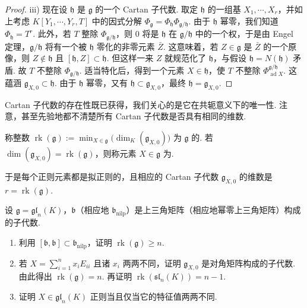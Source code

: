 \begin{proof}
iii) 现在设 $\mathfrak h$ 是 $\mathfrak g$ 的一个 Cartan 子代数. 取定 $\mathfrak h$ 的一组基 $X_1,\cdots,X_r$，并如上考虑 $K[Y_1,\cdots,Y_r,T]$ 中的因式分解 $\Phi_{\mathfrak g}=\Phi_{\mathfrak h}\Phi_{\mathfrak g/\mathfrak h}$. 由于 $\mathfrak h$ 幂零，我们知道 $\Phi_{\mathfrak h}=T^r$. 此外，若 $T$ 整除 $\Phi_{\mathfrak g/\mathfrak h}$，则 $0$ 将是 $\mathfrak h$ 在 $\mathfrak g/\mathfrak h$ 中的一个权，于是由 Engel 定理，$\mathfrak g/\mathfrak h$ 将有一个被 $\mathfrak h$ 零化的非零元素 $\bar Z$. 这意味着，若 $Z\in\mathfrak g$ 是 $\bar Z$ 的一个原像，则 $Z\notin\mathfrak h$ 且 $[\mathfrak h,Z]\subset\mathfrak h$. 但这样一来 $Z$ 就规范化了 $\mathfrak h$，与假设 $\mathfrak h=N(\mathfrak h)$ 矛盾. 故 $T$ 不整除 $\Phi_{\mathfrak g/\mathfrak h}$. 适当特化后，得到一个元素 $X\in\mathfrak h$，使 $T$ 不整除 $\Phi^{\mathfrak g/\mathfrak h}_{\operatorname{ad}X}$. 这蕴涵 $\mathfrak g_{X,0}\subset\mathfrak h$. 由于 $\mathfrak h$ 幂零，又有 $\mathfrak h\subset\mathfrak g_{X,0}$，最终 $\mathfrak h=\mathfrak g_{X,0}$.
\end{proof}
Cartan 子代数的存在性既已获得，我们关心的是它在共轭意义下的唯一性. 注意，甚至先验地都不清楚所有 Cartan 子代数是否具有相同的维数.
\begin{definition*}
称整数 $\operatorname{rk}(\mathfrak g):=\min_{X\in\mathfrak g}\big(\dim_K(\mathfrak g_{X,0})\big)$ 为 $\mathfrak g$ 的. 若 $\dim(\mathfrak g_{X,0})=\operatorname{rk}(\mathfrak g)$，则称元素 $X\in\mathfrak g$ 为.
\end{definition*}
于是每个正则元素都是拟正则的，且相应的 Cartan 子代数 $\mathfrak g_{X,0}$ 的维数是 $r=\operatorname{rk}(\mathfrak g)$.
\begin{exercise*}
设 $\mathfrak g=\mathfrak{gl}_n(K)$，$\mathfrak b$（相应地 $\mathfrak b_{\mathrm{nilp}}$）是上三角矩阵（相应地幂零上三角矩阵）构成的子代数.
\begin{enumerate}[label=\roman*)]
\item 利用 $[\mathfrak b,\mathfrak b]\subset\mathfrak b_{\mathrm{nilp}}$，证明 $\operatorname{rk}(\mathfrak g)\geqslant n$.
\item 若 $X=\sum_{i=1}^n x_iE_{ii}$ 且诸 $x_i$ 两两不同，证明 $\mathfrak g_{X,0}$ 是对角矩阵构成的子代数. 由此得出 $\operatorname{rk}(\mathfrak g)=n$. 再证明 $\operatorname{rk}(\mathfrak{sl}_n(K))=n-1$.
\item 证明 $X\in\mathfrak{gl}_n(K)$ 正则当且仅当它的特征值两两不同.
\end{enumerate}
\end{exercise*}
